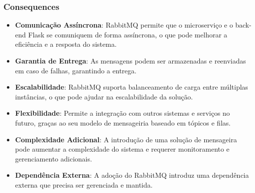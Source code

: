 \subsubsection*{Consequences}
\begin{itemize}
	\item \textbf{Comunicação Assíncrona}: RabbitMQ permite que o microserviço e o back-end Flask se comuniquem de forma assíncrona, o que pode melhorar a eficiência e a resposta do sistema.
	\item \textbf{Garantia de Entrega}: As mensagens podem ser armazenadas e reenviadas em caso de falhas, garantindo a entrega.
	\item \textbf{Escalabilidade}: RabbitMQ suporta balanceamento de carga entre múltiplas instâncias, o que pode ajudar na escalabilidade da solução.
	\item \textbf{Flexibilidade}: Permite a integração com outros sistemas e serviços no futuro, graças ao seu modelo de mensageiria baseado em tópicos e filas.
	\item \textbf{Complexidade Adicional}: A introdução de uma solução de mensageira pode aumentar a complexidade do sistema e requerer monitoramento e gerenciamento adicionais.
	\item \textbf{Dependência Externa}: A adoção do RabbitMQ introduz uma dependência externa que precisa ser gerenciada e mantida.
\end{itemize}

\newpage
